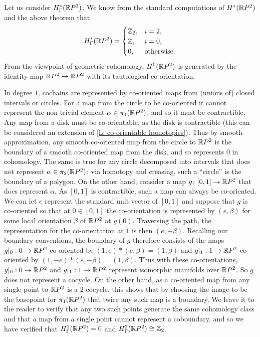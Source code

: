 \begin{example}\label{E: geometric cohomology of RP2}
	Let us consider $H^*_\Gamma(\mathbb{R} P^2)$.
	We know from the standard computations of $H^*(\mathbb{R} P^2)$ and the above theorem that
	\begin{equation*}
		H_\Gamma^i(\mathbb{R} P^2) =
		\begin{cases}
			\mathbb{Z}_2,&i = 2,\\
			\mathbb{Z},&i = 0,\\
			0,&\text{otherwise.}
		\end{cases}
	\end{equation*}
	From the viewpoint of geometric cohomology, $H^0(\mathbb{R} P^2)$ is generated by the identity map $\mathbb{R} P^2 \to \mathbb{R} P^2$ with its tautological co-orientation.

	In degree $1$, cochains are represented by co-oriented maps from (unions of) closed intervals or circles.
	For a map from the circle to be co-oriented it cannot represent the non-trivial element $\alpha \in \pi_1(\mathbb{R} P^2)$, and so it must be contractible.
	Any map from a disk must be co-orientable, as the disk is contractible (this can be considered an extension of \cref{L: co-orientable homotopies}).
	Thus by smooth approximation, any smooth co-oriented map from the circle to $\mathbb{R} P^2$ is the boundary of a smooth co-oriented map from the disk, and so represents $0$ in cohomology.
	The same is true for any circle decomposed into intervals that does not represent $\alpha \in \pi_2(\mathbb{R} P^2)$; via homotopy and creasing, such a ``circle'' is the boundary of a polygon.
	On the other hand, consider a map $g \colon [0,1] \to \mathbb{R} P^2$ that does represent $\alpha$.
	As $[0,1]$ is contractible, such a map can always be co-oriented.
	We can let $e$ represent the standard unit vector of $[0,1]$ and suppose that $g$ is co-oriented so that at $0 \in [0,1]$ the co-orientation is represented by $(e,\beta)$ for some local orientation $\beta$ of $\mathbb{R} P^2$ at $g(0)$.
	Traversing the path, the representation for the co-orientation at $1$ is then $(e,-\beta)$.
	Recalling our boundary conventions, the boundary of $g$ therefore consists of the maps $g|_0:0 \to \mathbb{R} P^2$ co-oriented by $(1,e)*(e,\beta) = (1,\beta)$ and $g|_1:1 \to \mathbb{R} P^2$ co-oriented by $(1,-e)*(e,-\beta) = (1,\beta)$.
	Thus with these co-orientations, $g|_0:0 \to \mathbb{R} P^2$ and $g|_1:1 \to \mathbb{R} P^2$ represent isomorphic manifolds over $\mathbb{R} P^2$.
	So $g$ does not represent a cocycle.
	On the other hand, as a co-oriented map from any single point to $\mathbb{R} P^2$ is a $2$-cocycle, this shows that by choosing the image to be the basepoint for $\pi_1(\mathbb{R} P^2)$ that twice any such map is a boundary.
	We leave it to the reader to verify that any two such points generate the same cohomology class and that a map from a single point cannot represent a coboundary, and so we have verified that $H^1_\Gamma(\mathbb{R} P^2) = 0$ and $H_\Gamma^2(\mathbb{R} P^2) \cong \mathbb{Z}_2$.
\end{example}

